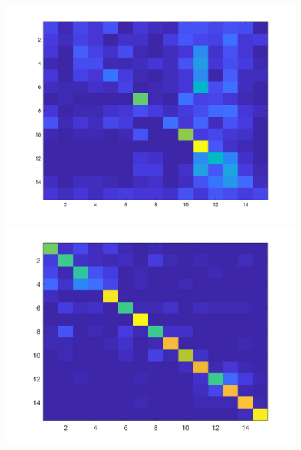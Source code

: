 \documentclass[letter, 11pt]{article}
\begin{document}
\begin{figure}[H]
        \centering
        \includegraphics[width=\textwidth]{HW3/RESULT/ClassifyKNN_Tiny_confusion.png}
    \endminipage\hfill
        \centering
        \includegraphics[width=\textwidth]{HW3/RESULT/ClassifyKNN_BOW_confusion.jpg}
    \endminipage\hfill
        \centering

\end{figure}
\end{document}
